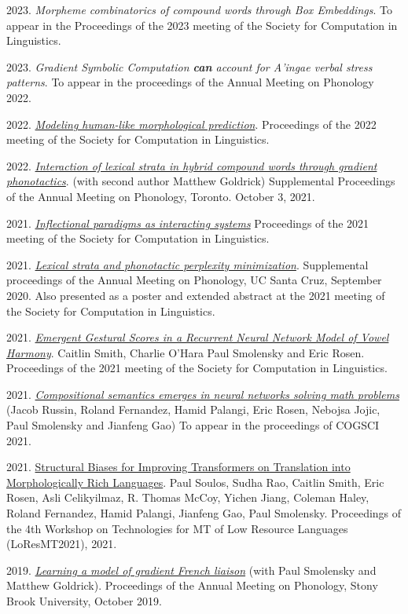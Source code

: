 \documentclass[11pt]{article}
\newcommand{\itt}[1]{\textit{#1}}
\newcommand{\ii}{\item}
\begin{document}
\begin{enumerate}[label={[\arabic*]}]
\ii 2023. \itt{Morpheme combinatorics of compound words through Box Embeddings}. To appear in the Proceedings of the 2023 meeting of the Society for Computation in Linguistics.
\ii 2023. \textit{Gradient Symbolic Computation \textbf{can} account for A'ingae verbal stress patterns}. To appear in the proceedings of the Annual Meeting on Phonology 2022.
\ii 2022. \href{https://aclanthology.org/2022.scil-1.11/}{\textit{Modeling human-like morphological prediction}}. Proceedings of the 2022 meeting of the Society for Computation in Linguistics.
\ii 2022. \href{https://journals.linguisticsociety.org/proceedings/index.php/amphonology/article/view/5158/4833}{\textit{Interaction of lexical strata in hybrid compound words through gradient phonotactics}}. (with second author Matthew Goldrick) Supplemental Proceedings of the Annual Meeting on Phonology, Toronto. October 3, 2021.
\ii 2021. \href{https://scholarworks.umass.edu/scil/vol4/iss1/14/}{\itt{Inflectional paradigms as interacting systems}} Proceedings of the 2021 meeting of the Society for Computation in Linguistics.
\ii 2021. \href{https://scholarworks.umass.edu/scil/vol4/iss1/49/}{\itt{Lexical strata and phonotactic perplexity minimization}}. Supplemental proceedings of the Annual Meeting on Phonology, UC Santa Cruz, September 2020. Also presented as a poster and extended abstract at the 2021 meeting of the Society for Computation in Linguistics.
\ii 2021. \href{https://caitlinsmith14.github.io/pdf/smithetal_scil2021_paper.pdf}{\itt{Emergent Gestural Scores in a Recurrent Neural Network Model of Vowel Harmony}}. Caitlin Smith, Charlie O'Hara Paul Smolensky and Eric Rosen.  Proceedings of the 2021 meeting of the Society for Computation in Linguistics.
\ii 2021. \href{https://en.x-mol.com/paper/article/1395477939799703552}{\itt{Compositional semantics emerges in neural networks solving math problems}} (Jacob Russin, Roland Fernandez, Hamid Palangi, Eric Rosen, Nebojsa Jojic, Paul Smolensky and Jianfeng Gao) To appear in the proceedings of COGSCI 2021.
\ii 2021. \href{https://arxiv.org/abs/2208.06061}{Structural Biases for Improving Transformers on Translation into Morphologically Rich Languages}. Paul Soulos, Sudha Rao, Caitlin Smith, Eric Rosen, Asli Celikyilmaz, R. Thomas McCoy, Yichen Jiang, Coleman Haley, Roland Fernandez, Hamid Palangi, Jianfeng Gao, Paul Smolensky. Proceedings of the 4th Workshop on Technologies for MT of Low Resource Languages (LoResMT2021), 2021. 
\ii 2019. \href{https://journals.linguisticsociety.org/proceedings/index.php/amphonology/article/view/4680}{\itt{Learning a model of gradient French liaison}} (with Paul Smolensky and Matthew Goldrick). Proceedings of the Annual Meeting on Phonology, Stony Brook University, October 2019.

\end{enumerate}
\end{document}
